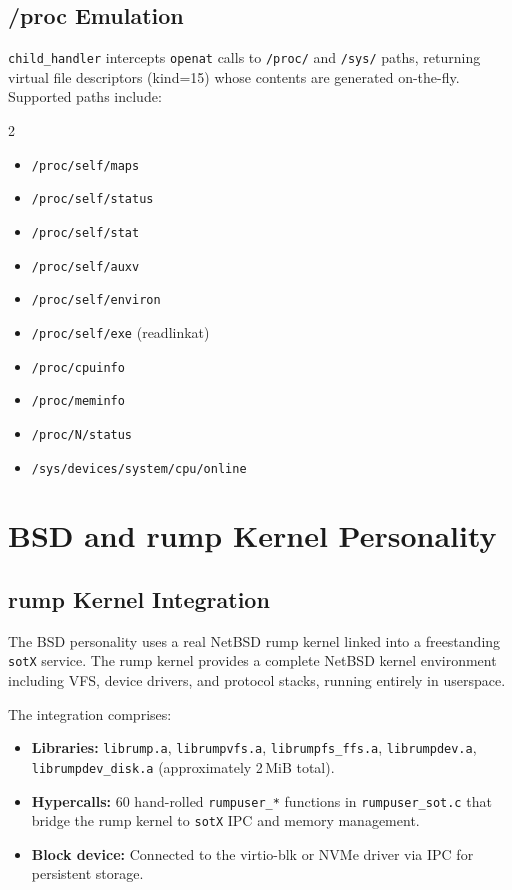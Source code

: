 \documentclass[11pt,a4paper,twoside]{report}
\theoremstyle{definition}
\newcommand{\sotX}{\texttt{sotX}}
\newcommand{\sotX}{\texttt{sotX}}
\begin{document}
\section{/proc Emulation}

\texttt{child\_handler} intercepts \texttt{openat} calls to \texttt{/proc/}
and \texttt{/sys/} paths, returning virtual file descriptors (kind=15) whose
contents are generated on-the-fly. Supported paths include:

\begin{multicols}{2}
\begin{itemize}[leftmargin=1em,itemsep=0pt]
  \item \texttt{/proc/self/maps}
  \item \texttt{/proc/self/status}
  \item \texttt{/proc/self/stat}
  \item \texttt{/proc/self/auxv}
  \item \texttt{/proc/self/environ}
  \item \texttt{/proc/self/exe} (readlinkat)
  \item \texttt{/proc/cpuinfo}
  \item \texttt{/proc/meminfo}
  \item \texttt{/proc/N/status}
  \item \texttt{/sys/devices/system/cpu/online}
\end{itemize}
\end{multicols}


\chapter{BSD and rump Kernel Personality}
\label{ch:bsd}

\section{rump Kernel Integration}

The BSD personality uses a real NetBSD rump kernel linked into a freestanding
\sotX{} service. The rump kernel provides a complete NetBSD kernel
environment including VFS, device drivers, and protocol stacks, running
entirely in userspace.

The integration comprises:
\begin{itemize}[leftmargin=1.4em]
  \item \textbf{Libraries:} \texttt{librump.a}, \texttt{librumpvfs.a},
    \texttt{librumpfs\_ffs.a}, \texttt{librumpdev.a},
    \texttt{librumpdev\_disk.a} (approximately 2\,MiB total).
  \item \textbf{Hypercalls:} 60 hand-rolled \texttt{rumpuser\_*} functions
    in \texttt{rumpuser\_sot.c} that bridge the rump kernel to \sotX{}
    IPC and memory management.
  \item \textbf{Block device:} Connected to the virtio-blk or NVMe driver
    via IPC for persistent storage.
\end{itemize}
\end{document}
